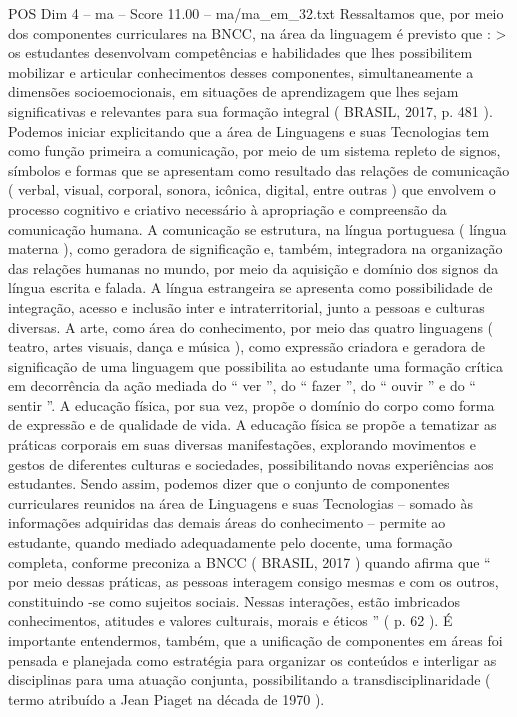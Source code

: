 \begin{textsample}{POS Dim 4 – ma – Score 11.00 – ma/ma\_em\_32.txt}
Ressaltamos que, por meio dos componentes curriculares na BNCC, na área da linguagem é previsto que : > os estudantes desenvolvam competências e habilidades que lhes possibilitem mobilizar e articular conhecimentos desses componentes, simultaneamente a dimensões socioemocionais, em situações de aprendizagem que lhes sejam significativas e relevantes para sua formação integral ( BRASIL, 2017, p. 481 ).
Podemos iniciar explicitando que a área de Linguagens e suas Tecnologias tem como função primeira a comunicação, por meio de um sistema repleto de signos, símbolos e formas que se apresentam como resultado das relações de comunicação ( verbal, visual, corporal, sonora, icônica, digital, entre outras ) que envolvem o processo cognitivo e criativo necessário à apropriação e compreensão da comunicação humana.
A comunicação se estrutura, na língua portuguesa ( língua materna ), como geradora de significação e, também, integradora na organização das relações humanas no mundo, por meio da aquisição e domínio dos signos da língua escrita e falada.
A língua estrangeira se apresenta como possibilidade de integração, acesso e inclusão inter e intraterritorial, junto a pessoas e culturas diversas.
A arte, como área do conhecimento, por meio das quatro linguagens ( teatro, artes visuais, dança e música ), como expressão criadora e geradora de significação de uma linguagem que possibilita ao estudante uma formação crítica em decorrência da ação mediada do “ ver ”, do “ fazer ”, do “ ouvir ” e do “ sentir ”.
A educação física, por sua vez, propõe o domínio do corpo como forma de expressão e de qualidade de vida.
A educação física se propõe a tematizar as práticas corporais em suas diversas manifestações, explorando movimentos e gestos de diferentes culturas e sociedades, possibilitando novas experiências aos estudantes.
Sendo assim, podemos dizer que o conjunto de componentes curriculares reunidos na área de Linguagens e suas Tecnologias – somado às informações adquiridas das demais áreas do conhecimento – permite ao estudante, quando mediado adequadamente pelo docente, uma formação completa, conforme preconiza a BNCC ( BRASIL, 2017 ) quando afirma que “ por meio dessas práticas, as pessoas interagem consigo mesmas e com os outros, constituindo -se como sujeitos sociais.
Nessas interações, estão imbricados conhecimentos, atitudes e valores culturais, morais e éticos ” ( p. 62 ).
É importante entendermos, também, que a unificação de componentes em áreas foi pensada e planejada como estratégia para organizar os conteúdos e interligar as disciplinas para uma atuação conjunta, possibilitando a transdisciplinaridade ( termo atribuído a Jean Piaget na década de 1970 ).

\end{textsample}

